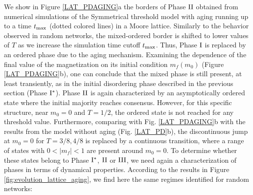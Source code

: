 We show in Figure \ref{LAT_PDAGING}a the borders of Phase ${\rm II}$ obtained from numerical simulations of the Symmetrical threshold model with aging running up to a time $t_{\rm max}$ (dotted colored lines) in a Moore lattice. Similarly to the behavior observed in random networks, the mixed-ordered border is shifted to lower values of $T$ as we increase the simulation time cutoff $t_{\rm max}$. Thus, Phase ${\rm I}$ is replaced by an ordered phase due to the aging mechanism. Examining the dependence of the final value of the magnetization on its initial condition  $m_f(m_0)$  (Figure \ref{LAT_PDAGING}b), one can conclude that the mixed phase is still present, at least transiently, as in the initial disordering phase described in the previous section (Phase ${\rm I}^{*}$). Phase ${\rm II}$ is again characterized by an asymptotically ordered state where the initial majority reaches consensus. However, for this specific structure, near $m_0 = 0$ and $T = 1/2$, the ordered state is not reached for any threshold value. Furthermore, comparing with Fig. \ref{LAT_PDAGING}b with the results from the model without aging (Fig. \ref{LAT_PD}b), the discontinuous jump at $m_0 = 0$ for $T = 3/8, 4/8$ is replaced by a continuous transition, where a range of states with $0 < |m_f| < 1$ are present around $m_0 = 0$. To determine whether these states belong to Phase ${\rm I}^{*}$, ${\rm II}$ or ${\rm III}$, we need again a characterization of phases in terms of dynamical properties. According to the results in Figure \ref{fig:evolution_lattice_aging}, we find here the same regimes identified for random networks:
